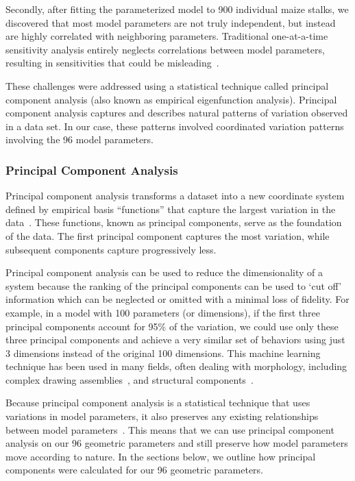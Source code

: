 Secondly, after fitting the parameterized model to 900 individual maize stalks, we discovered that most model parameters are not truly independent, but instead are highly correlated with neighboring parameters. Traditional one-at-a-time sensitivity analysis entirely neglects correlations between model parameters, resulting in sensitivities that could be misleading~.

These challenges were addressed using a statistical technique called principal component analysis (also known as empirical eigenfunction analysis). Principal component analysis captures and describes natural patterns of variation observed in a data set. In our case, these patterns involved coordinated variation patterns involving the 96 model parameters. 

\subsubsection{Principal Component Analysis}
\label{sssec:principal_component_analysis}
Principal component analysis transforms a dataset into a new coordinate system defined by empirical basis “functions” that capture the largest variation in the data~. These functions, known as principal components, serve as the foundation of the data. The first principal component captures the most variation, while subsequent components capture progressively less.

Principal component analysis can be used to reduce the dimensionality of a system because the ranking of the principal components can be used to ‘cut off’ information which can be neglected or omitted with a minimal loss of fidelity. For example, in a model with 100 parameters (or dimensions), if the first three principal components account for 95\% of the variation, we could use only these three principal components and achieve a very similar set of behaviors using just 3 dimensions instead of the original 100 dimensions. This machine learning technique has been used in many fields, often dealing with morphology, including complex drawing assemblies~, and structural components~.

Because principal component analysis is a statistical technique that uses variations in model parameters, it also preserves any existing relationships between model parameters~. This means that we can use principal component analysis on our 96 geometric parameters and still preserve how model parameters move according to nature. In the sections below, we outline how principal components were calculated for our 96 geometric parameters.

